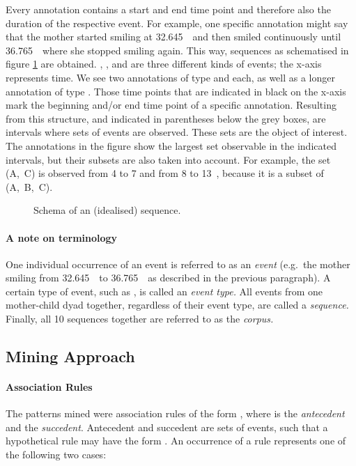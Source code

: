Every annotation contains a start and end time point and therefore also the duration of the respective event.
For example, one specific annotation might say that the mother started smiling at 32.645~\s\ and then smiled continuously until 36.765~\s\, where she stopped smiling again.
This way, sequences as schematised in figure \ref{fig:idealseq} are obtained.
, , and  are three different kinds of events; the x-axis represents time.
We see two annotations of type  and  each, as well as a longer annotation of type .
Those time points that are indicated in black on the x-axis mark the beginning and/or end time point of a specific annotation.
Resulting from this structure, and indicated in parentheses below the grey boxes, are intervals where sets of events are observed.
These sets are the object of interest.
The annotations in the figure show the largest set observable in the indicated intervals, but their subsets are also taken into account.
For example, the set (A,~C) is observed from 4 to 7 and from 8 to 13~\s, because it is a subset of (A,~B,~C).

\begin{figure}
	\centering
	
	\caption[Sequence schema.]{Schema of an (idealised) sequence.}
	\label{fig:idealseq}
\end{figure}

\paragraph{A note on terminology}
One individual occurrence of an event is referred to as an \emph{event} (e.g.~the mother smiling from 32.645~\s\ to 36.765~\s\ as described in the previous paragraph).
A certain type of event, such as \code{\mosm}, is called an \emph{event type.}
All events from one mother-child dyad together, regardless of their event type, are called a \emph{sequence.}
Finally, all 10 sequences together are referred to as the \emph{corpus.}


\subsection{Mining Approach}
\label{ssec:fpmmetapp}
\paragraph{Association Rules}
The patterns \citet{rohlfing_multimodal_underreview} mined were association rules of the form , where  is the \emph{antecedent} and  the \emph{succedent}.
Antecedent and succedent are sets of events, such that a hypothetical rule may have the form .
An occurrence of a rule represents one of the following two cases:

